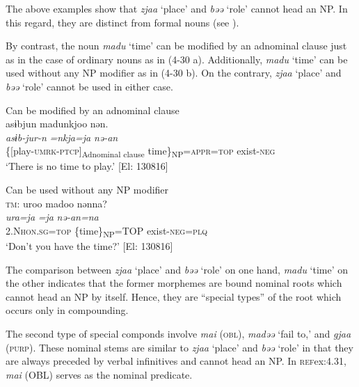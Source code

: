 The above examples show that \textit{zjaa} ‘place’ and \textit{bəə} ‘role’ cannot head an NP. In this regard, they are distinct from formal nouns (see ).

By contrast, the noun \textit{madu} ‘time’ can be modified by an adnominal clause just as in the case of ordinary nouns as in (4-30 a). Additionally, \textit{madu} ‘time’ can be used without any NP modifier as in (4-30 b). On the contrary, \textit{zjaa} ‘place’ and \textit{bəə} ‘role’ cannot be used in either case.

\ea \label{ex:4.30}
\ea Can be modified by an adnominal clause\\\label{ex:4.30a}
\glll  asɨbjun  madunkjoo  nən.\\
    \textit{asɨb-jur-n}  \textit{=nkja=ja}  \textit{nə-an}\\
    \{[play-\textsc{umrk}-\textsc{ptcp}]\textsubscript{Adnominal clause} time\}\textsubscript{NP}=\textsc{appr}=\textsc{top}  exist-\textsc{neg}\\
    \glt     ‘There is no time to play.’ [El: 130816]

\ex Can be used without any NP modifier\\\label{ex:4.30b}
\glll  \textsc{tm}:  uroo  madoo  nənna?\\
    \textit{ura=ja}  \textit{=ja}  \textit{nə-an=na}\\
    2.N\textsc{hon}.\textsc{sg}=\textsc{top}\textsubscript{} \{time\}\textsubscript{NP}=TOP  exist-\textsc{neg}=\textsc{plq}\\
    \glt     ‘Don’t you have the time?’ [El: 130816]
\z
\z

The comparison between \textit{zjaa} ‘place’ and \textit{bəə} ‘role’ on one hand, \textit{madu} ‘time’ on the other indicates that the former morphemes are bound nominal roots which cannot head an NP by itself. Hence, they are “special types” of the root which occurs only in compounding.

The second type of special componds involve \textit{mai} (\textsc{obl}), \textit{madəə} ‘fail to,’ and \textit{gjaa} (\textsc{purp}). These nominal stems are similar to \textit{zjaa} ‘place’ and \textit{bəə} ‘role’ in that they are always preceded by verbal infinitives and cannot head an NP. In \textsc{ref}{ex:4.31}, \textit{mai} (OBL) serves as the nominal predicate.

